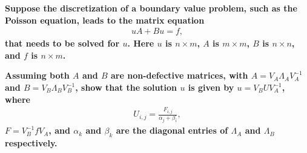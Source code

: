 \textbf{Suppose the discretization of a boundary value problem, such as the Poisson equation, leads to the matrix equation}
\begin{align*}
uA + Bu = f,
\end{align*}
\textbf{that needs to be solved for $u$. Here $u$ is $n \times m$, $A$ is $m \times m$, $B$ is $n \times n$, and $f$ is $n \times m$.}

\textbf{Assuming both $A$ and $B$ are non-defective matrices, with $A = V_A \Lambda_AV_A^{-1}$ and $B = V_B \Lambda_BV_B^{-1}$, show that the solution $u$ is given by $u = V_B UV_A^{-1}$, where}
\begin{align*}
U_{i,j} = \frac{F_{i,j}}{\alpha_j + \beta_i},
\end{align*}
\textbf{$F = V_B^{-1}fV_A$, and $\alpha_k$ and $\beta_k$ are the diagonal entries of $\Lambda_A$ and $\Lambda_B$ respectively.}


